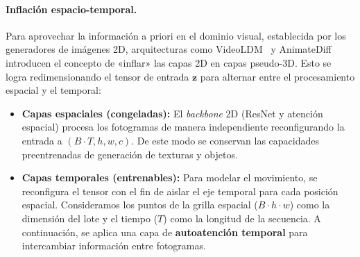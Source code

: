 \documentclass[../../book-main_es.tex]{subfiles}
\begin{document}
\paragraph{Inflación espacio-temporal.}
Para aprovechar la información a priori en el dominio visual, establecida por los generadores de 
imágenes 2D, arquitecturas como VideoLDM~\citep{blattmann2023align} y 
AnimateDiff~\citep{guo2023animatediff} introducen el concepto de «inflar» las capas 2D 
en capas pseudo-3D. Esto se logra redimensionando el tensor de entrada 
$\boldsymbol{z}$ para alternar entre el procesamiento espacial y el temporal:
\begin{itemize}
    \item \textbf{Capas espaciales (congeladas):} El \textit{backbone} 2D (ResNet y atención 
          espacial) procesa los fotogramas de manera independiente reconfigurando la entrada a 
          $(B \cdot T, h, w, c)$. De este modo se conservan las capacidades preentrenadas de generación de 
          texturas y objetos.
    \item \textbf{Capas temporales (entrenables):} Para modelar el movimiento, se reconfigura 
          el tensor con el fin de aislar el eje temporal para cada posición espacial. 
          Consideramos los puntos de la grilla espacial ($B \cdot h \cdot w$) como la dimensión 
          del lote y el tiempo ($T$) como la longitud de la secuencia. A continuación, se aplica 
          una capa de \textbf{autoatención temporal} para intercambiar información entre fotogramas.
\end{itemize}
\end{document}
